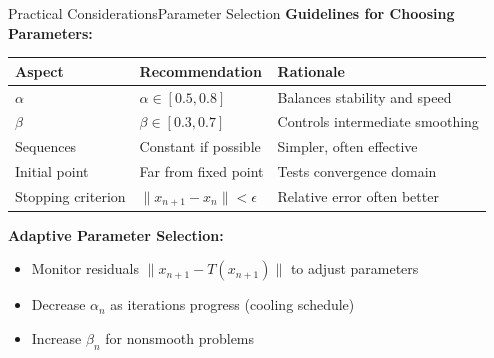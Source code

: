 \documentclass[aspectratio=169,10pt]{beamer}
\begin{document}
\begin{frame}{Practical Considerations}{Parameter Selection}
\textbf{Guidelines for Choosing Parameters:}

\vspace{0.3cm}

\begin{tabular}{|l|l|l|}
\hline
\textbf{Aspect} & \textbf{Recommendation} & \textbf{Rationale} \\
\hline
$\alpha$ & $\alpha \in [0.5, 0.8]$ & Balances stability and speed \\
\hline
$\beta$ & $\beta \in [0.3, 0.7]$ & Controls intermediate smoothing \\
\hline
Sequences & Constant if possible & Simpler, often effective \\
\hline
Initial point & Far from fixed point & Tests convergence domain \\
\hline
Stopping criterion & $\|x_{n+1} - x_n\| < \epsilon$ & Relative error often better \\
\hline
\end{tabular}

\vspace{0.3cm}

\textbf{Adaptive Parameter Selection:}
\begin{itemize}
    \item Monitor residuals $\|x_{n+1} - T(x_{n+1})\|$ to adjust parameters
    \item Decrease $\alpha_n$ as iterations progress (cooling schedule)
    \item Increase $\beta_n$ for nonsmooth problems
\end{itemize}
\end{frame}
\end{document}
